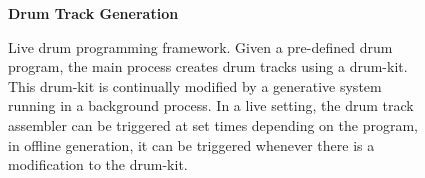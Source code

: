 \documentclass[\main/thesis.tex]{subfiles}
\begin{document}
\begin{figure}[tpb]
    \begin{center}
    \textbf{Drum Track Generation}
    \end{center}
    \caption{Live drum programming framework. Given a pre-defined drum program, the main process creates drum tracks using a drum-kit. This drum-kit is continually modified by a generative system running in a background process. In a live setting, the drum track assembler can be triggered at set times depending on the program, in offline generation, it can be triggered whenever there is a modification to the drum-kit.  }
\label{fig:live_drumming}
\end{figure} 
\end{document}
